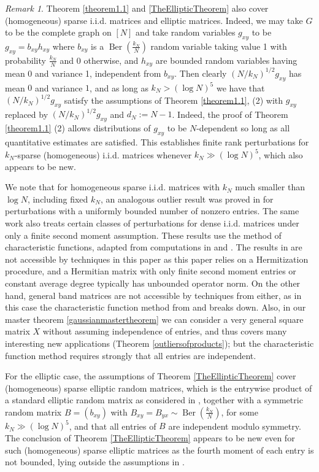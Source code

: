 \documentclass[11pt,reqno]{amsart}
\theoremstyle{plain}
\theoremstyle{remark}
\newtheorem{remark}[theorem]{Remark}
\numberwithin{equation}{section}
\begin{document}
\begin{remark}\label{remark1.31.3aga}
    Theorem \ref{theorem1.1} and \ref{TheEllipticTheorem} also cover (homogeneous) sparse i.i.d. matrices and elliptic matrices. Indeed, we may take $G$ to be the complete graph on $[N]$ and take random variables $g_{xy}$ to be $g_{xy}=b_{xy}h_{xy}$ where $b_{xy}$ is a $\operatorname{Ber}(\frac{k_N}{N})$ random variable taking value 1 with probability $\frac{k_N}{N}$ and 0 otherwise, and $h_{xy}$ are bounded random variables having mean 0 and variance 1, independent from $b_{xy}$. Then clearly $(N/k_N)^{1/2}g_{xy}$ has mean $0$ and variance $1$, and as long as $k_N>(\log N)^5$ we have that $(N/k_N)^{1/2}g_{xy}$ satisfy the assumptions of Theorem \ref{theorem1.1}, (2) with $g_{xy}$ replaced by $(N/k_N)^{1/2}g_{xy}$ and $d_N:=N-1$. Indeed, the proof of Theorem \ref{theorem1.1} (2) allows distributions of $g_{xy}$ to be $N$-dependent so long as all quantitative estimates are satisfied. This establishes finite rank perturbations for $k_N$-sparse (homogeneous) i.i.d. matrices whenever $k_N\gg(\log N)^5$, which also appears to be new. 
    
    We note that for homogeneous sparse i.i.d. matrices with $k_N$ much smaller than $\log N$, including fixed $k_N$, an analogous outlier result was proved in \cite{han2024finite} for perturbations with a uniformly bounded number of nonzero entries. The same work also treats certain classes of perturbations for dense i.i.d. matrices under only a finite second moment assumption. These results use the method of characteristic functions, adapted from computations in \cite{bordenave2021convergence} and \cite{coste2023sparse}. The results in \cite{han2024finite} are not accessible by techniques in this paper as this paper relies on a Hermitization procedure, and a Hermitian matrix with only finite second moment entries or constant average degree typically has unbounded operator norm. On the other hand, general band matrices are not accessible by techniques from \cite{han2024finite} either, as in this case the characteristic function method from \cite{bordenave2021convergence} and  \cite{coste2023sparse} breaks down. Also, in our master theorem \ref{gaussianmastertheorem} we can consider a very general square matrix $X$ without assuming independence of entries, and thus covers many interesting new applications (Theorem \ref{outliersofproducts}); but the characteristic function method requires strongly that all entries are independent.

For the elliptic case, the assumptions of Theorem \ref{TheEllipticTheorem} cover (homogeneous) sparse elliptic random matrices, which is the entrywise product of a standard elliptic random matrix as considered in \cite{article1221}, together with a symmetric random matrix $B=(b_{xy})$ with $B_{xy}=B_{yx}\sim \operatorname{Ber}(\frac{k_N}{N})$, for some $
k_N\gg(\log N)^5$, and that all entries of $B$ are independent modulo symmetry. The conclusion of Theorem \ref{TheEllipticTheorem} appears to be new even for such (homogeneous) sparse elliptic matrices as the fourth moment of each entry is not bounded, lying outside the assumptions in \cite{article1221}.

\end{remark}
\end{document}
